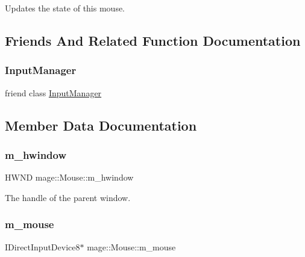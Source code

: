 Updates the state of this mouse. 

\subsection{Friends And Related Function Documentation}
\hypertarget{classmage_1_1_mouse_af0e8c3dcc20b7ddcaf63506363a22821}{}\label{classmage_1_1_mouse_af0e8c3dcc20b7ddcaf63506363a22821} 
\subsubsection{\texorpdfstring{Input\+Manager}{InputManager}}
{\footnotesize\ttfamily friend class \hyperlink{classmage_1_1_input_manager}{Input\+Manager}\hspace{0.3cm}{\ttfamily [friend]}}



\subsection{Member Data Documentation}
\hypertarget{classmage_1_1_mouse_a0c67906df7b8b0cce013c724be4625ac}{}\label{classmage_1_1_mouse_a0c67906df7b8b0cce013c724be4625ac} 
\subsubsection{\texorpdfstring{m\+\_\+hwindow}{m\_hwindow}}
{\footnotesize\ttfamily H\+W\+ND mage\+::\+Mouse\+::m\+\_\+hwindow\hspace{0.3cm}{\ttfamily [protected]}}

The handle of the parent window. \hypertarget{classmage_1_1_mouse_a873713cdf019671a94952d88faeb2b7a}{}\label{classmage_1_1_mouse_a873713cdf019671a94952d88faeb2b7a} 
\subsubsection{\texorpdfstring{m\+\_\+mouse}{m\_mouse}}
{\footnotesize\ttfamily I\+Direct\+Input\+Device8$\ast$ mage\+::\+Mouse\+::m\+\_\+mouse\hspace{0.3cm}{\ttfamily [protected]}}

